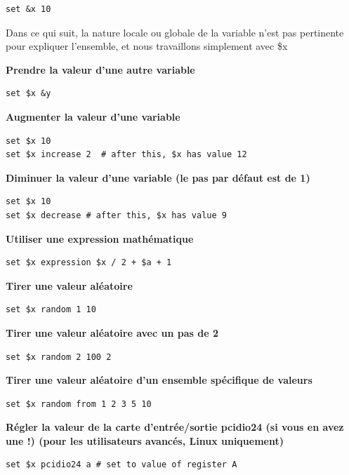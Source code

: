\documentclass[
]{book}
\begin{document}
\begin{verbatim}
set &x 10
\end{verbatim}

Dans ce qui suit, la nature locale ou globale de la variable n'est pas pertinente pour expliquer l'ensemble, et nous travaillons simplement avec \$x

\textbf{Prendre la valeur d'une autre variable}

\begin{verbatim}
set $x &y
\end{verbatim}

\textbf{Augmenter la valeur d'une variable}

\begin{verbatim}
set $x 10
set $x increase 2  # after this, $x has value 12
\end{verbatim}

\textbf{Diminuer la valeur d'une variable (le pas par défaut est de 1)}

\begin{verbatim}
set $x 10
set $x decrease # after this, $x has value 9
\end{verbatim}

\textbf{Utiliser une expression mathématique}

\begin{verbatim}
set $x expression $x / 2 + $a + 1
\end{verbatim}

\textbf{Tirer une valeur aléatoire}

\begin{verbatim}
set $x random 1 10
\end{verbatim}

\textbf{Tirer une valeur aléatoire avec un pas de 2}

\begin{verbatim}
set $x random 2 100 2
\end{verbatim}

\textbf{Tirer une valeur aléatoire d'un ensemble spécifique de valeurs}

\begin{verbatim}
set $x random from 1 2 3 5 10
\end{verbatim}

\textbf{Régler la valeur de la carte d'entrée/sortie pcidio24 (si vous en avez une !) (pour les utilisateurs avancés, Linux uniquement)}

\begin{verbatim}
set $x pcidio24 a # set to value of register A
\end{verbatim}
\end{document}
